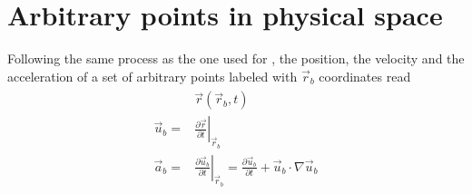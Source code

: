 \documentclass[letterpaper,10pt,english]{jupyterBook}
\begin{document}
\section{Arbitrary points in physical space}
\label{\detokenize{ch/continuum/kinematics:arbitrary-points-in-physical-space}}\label{\detokenize{ch/continuum/kinematics:continuum-kinematics-arbitrary-points}}
\sphinxAtStartPar
Following the same process as the one used for {\hyperref[\detokenize{ch/continuum/kinematics:continuum-kinematics-material-points}]{}}, the position, the velocity and the acceleration of a set of arbitrary points labeled with \(\vec{r}_b\) coordinates read
\begin{equation*}
\begin{split}\begin{aligned}
  & \vec{r}\left( \vec{r}_b, t \right) \\
  \vec{u}_b = & \left.\frac{\partial \vec{r}}{\partial t}\right|_{\vec{r}_b} \\
  \vec{a}_b = & \left.\frac{\partial \vec{u}_b}{\partial t}\right|_{\vec{r}_b} = \frac{\partial \vec{u}_b}{\partial t} + \vec{u}_b \cdot \nabla \vec{u}_b
\end{aligned}\end{split}
\end{equation*}
\end{document}
